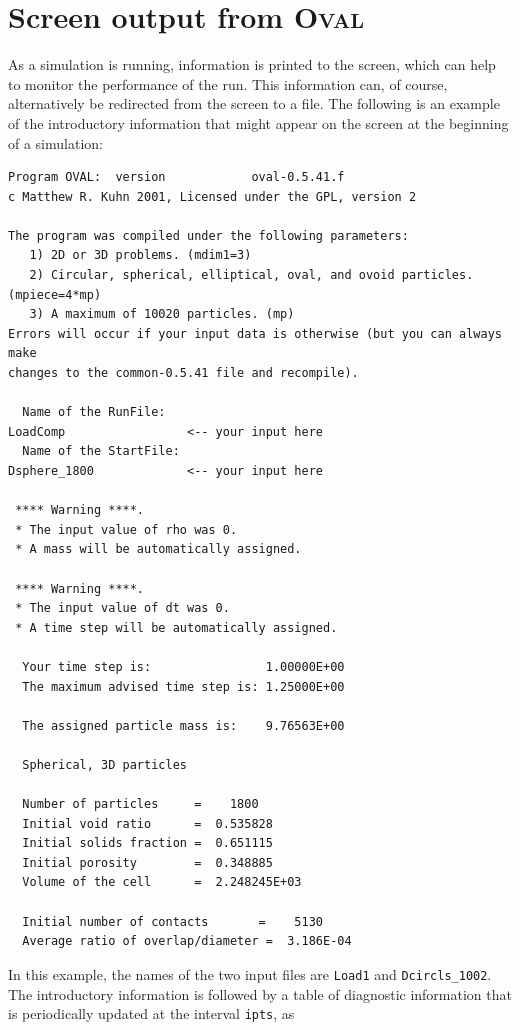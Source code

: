 \documentclass[letterpaper,11pt]{article}
\newcommand{\Oval}{\textsc{Oval}}
\begin{document}
\section{Screen output from \Oval}\label{sec:ScreenOval}
As a simulation is running, information is printed to the screen, which
can help to monitor the performance of the run.
This information can, of course, 
alternatively be redirected from the screen 
to a file.
The following is an example of the introductory information that might
appear on the screen at the beginning of a simulation:
\par
\footnotesize
\begin{verbatim}
Program OVAL:  version            oval-0.5.41.f
c Matthew R. Kuhn 2001, Licensed under the GPL, version 2

The program was compiled under the following parameters:
   1) 2D or 3D problems. (mdim1=3)
   2) Circular, spherical, elliptical, oval, and ovoid particles. (mpiece=4*mp)
   3) A maximum of 10020 particles. (mp)
Errors will occur if your input data is otherwise (but you can always make
changes to the common-0.5.41 file and recompile).
  
  Name of the RunFile:
LoadComp                 <-- your input here
  Name of the StartFile:
Dsphere_1800             <-- your input here
  
 **** Warning ****.
 * The input value of rho was 0.
 * A mass will be automatically assigned.
  
 **** Warning ****.
 * The input value of dt was 0.
 * A time step will be automatically assigned.

  Your time step is:                1.00000E+00
  The maximum advised time step is: 1.25000E+00

  The assigned particle mass is:    9.76563E+00

  Spherical, 3D particles

  Number of particles     =    1800
  Initial void ratio      =  0.535828
  Initial solids fraction =  0.651115
  Initial porosity        =  0.348885
  Volume of the cell      =  2.248245E+03

  Initial number of contacts       =    5130
  Average ratio of overlap/diameter =  3.186E-04
\end{verbatim}
\normalsize
\par
In this example, the names of the two input files are \texttt{Load1}
and \texttt{Dcircls\_1002}.
The introductory information is followed by a table of diagnostic
information that is periodically updated at the interval \texttt{ipts}, as
\end{document}
